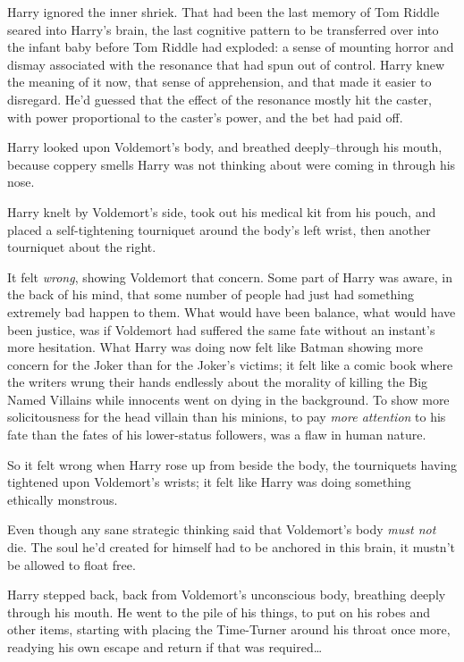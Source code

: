 Harry ignored the inner shriek. That had been the last memory of Tom Riddle seared into Harry's brain, the last cognitive pattern to be transferred over into the infant baby before Tom Riddle had exploded: a sense of mounting horror and dismay associated with the resonance that had spun out of control. Harry knew the meaning of it now, that sense of apprehension, and that made it easier to disregard. He'd guessed that the effect of the resonance mostly hit the caster, with power proportional to the caster's power, and the bet had paid off.

Harry looked upon Voldemort's body, and breathed deeply\---through his mouth, because coppery smells Harry was not thinking about were coming in through his nose.

Harry knelt by Voldemort's side, took out his medical kit from his pouch, and placed a self-tightening tourniquet around the body's left wrist, then another tourniquet about the right.

It felt \emph{wrong}, showing Voldemort that concern. Some part of Harry was aware, in the back of his mind, that some number of people had just had something extremely bad happen to them. What would have been balance, what would have been justice, was if Voldemort had suffered the same fate without an instant's more hesitation. What Harry was doing now felt like Batman showing more concern for the Joker than for the Joker's victims; it felt like a comic book where the writers wrung their hands endlessly about the morality of killing the Big Named Villains while innocents went on dying in the background. To show more solicitousness for the head villain than his minions, to pay \emph{more attention} to his fate than the fates of his lower-status followers, was a flaw in human nature.

So it felt wrong when Harry rose up from beside the body, the tourniquets having tightened upon Voldemort's wrists; it felt like Harry was doing something ethically monstrous.

Even though any sane strategic thinking said that Voldemort's body \emph{must not} die. The soul he'd created for himself had to be anchored in this brain, it mustn't be allowed to float free.

Harry stepped back, back from Voldemort's unconscious body, breathing deeply through his mouth. He went to the pile of his things, to put on his robes and other items, starting with placing the Time-Turner around his throat once more, readying his own escape and return if that was required{\ldots}

